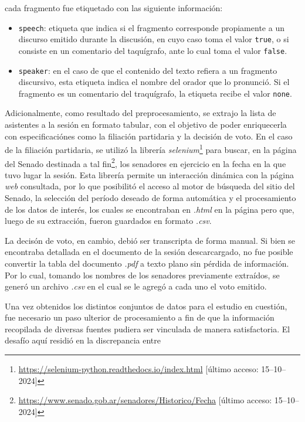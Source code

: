 cada fragmento fue etiquetado con las siguiente información:
\begin{itemize}
    \item \texttt{speech}: etiqueta que indica si el fragmento corresponde
    propiamente a un discurso emitido durante la discusión, en cuyo caso toma el
    valor \texttt{true}, o si consiste en un comentario del taquígrafo, ante lo cual
    toma el valor \texttt{false}.
    \item \texttt{speaker}: en el caso de que el contenido del texto refiera a
    un fragmento discursivo, esta etiqueta indica el nombre del orador que lo
    pronunció. Si el fragmento es un comentario del traquígrafo, la etiqueta
    recibe el valor \texttt{none}.
\end{itemize}
\par
Adicionalmente, como resultado del preprocesamiento, se extrajo la lista de
asistentes a la sesión en formato tabular, con el objetivo de poder
enriquecerla con especificaciónes como la filiación partidaria y la
decisión de voto. En el caso de la filiación partidaria, se utilizó la
librería \textit{selenium}\footnote{\url{https://selenium-python.readthedocs.io/index.html}
[último acceso: 15--10--2024]}
para buscar, en la {p\'agina} del Senado destinada a tal
fin\footnote{\url{https://www.senado.gob.ar/senadores/Historico/Fecha}
[último acceso: 15--10--2024]},
los senadores en ejercicio en la fecha en la que tuvo lugar la sesión.
Esta librería permite un interacción dinámica con la página \textit{web} consultada,
por lo que posibilitó el acceso al motor de búsqueda del sitio del Senado, la selección
del período deseado de forma automática y el procesamiento de los datos de interés,
los cuales se encontraban en \textit{.html} en la página pero que, luego de su
extracci\'on, fueron guardados en formato \textit{.csv}.
\par
La decisón de voto, en cambio, debió ser transcripta de forma manual. Si bien
se encontraba detallada en el documento de la sesión descarcargado, no fue posible
convertir la tabla del documento \textit{.pdf} a texto plano sin pérdida de información.
Por lo cual, tomando los nombres de los senadores previamente extra\'idos, se gener\'o
un archivo \textit{.csv} en el cual se le agregó a cada uno el voto emitido.
\par
Una vez obtenidos los distintos conjuntos de datos para el estudio en cuestión,
fue necesario un paso ulterior de procesamiento a fin de que la información
recopilada de diversas fuentes pudiera ser vinculada de manera
satisfactoria. El desaf\'io aqu\'i residi\'o en la discrepancia entre
